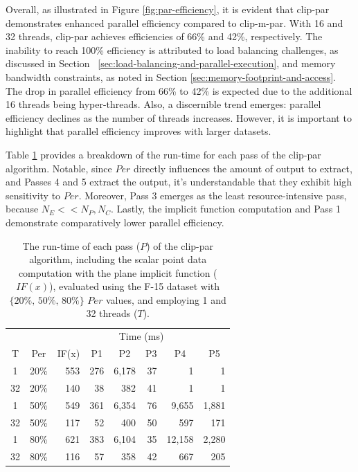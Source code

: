 \documentclass{egpubl}
\begin{document}
Overall, as illustrated in Figure \ref{fig:par-efficiency}, it is evident that clip-par demonstrates enhanced parallel efficiency compared to clip-m-par. With 16 and 32 threads, clip-par achieves efficiencies of 66\% and 42\%, respectively. The inability to reach 100\% efficiency is attributed to load balancing challenges, as discussed in Section ~\ref{sec:load-balancing-and-parallel-execution}, and memory bandwidth constraints, as noted in Section \ref{sec:memory-footprint-and-access}. The drop in parallel efficiency from 66\% to 42\% is expected due to the additional 16 threads being hyper-threads. Also, a discernible trend emerges: parallel efficiency declines as the number of threads increases. However, it is important to highlight that parallel efficiency improves with larger datasets.

Table \ref{tab:pass-time} provides a breakdown of the run-time for each pass of the clip-par algorithm. Notable, since $Per$ directly influences the amount of output to extract, and Passes 4 and 5 extract the output, it's understandable that they exhibit high sensitivity to $Per$. Moreover, Pass 3 emerges as the least resource-intensive pass, because $N_E << N_P, N_C$. Lastly, the implicit function computation and Pass 1 demonstrate comparatively lower parallel efficiency.

\begin{table}[h]
\centering
\caption{The run-time of each pass ($P$) of the clip-par algorithm, including the scalar point data computation with the plane implicit function ($IF(x)$),  evaluated using the F-15 dataset with   $\textit{\{20\%, 50\%, 80\%\}}$ $Per$ values, and employing 1 and 32 threads ($T$).}
\label{tab:pass-time}
\begin{tabular}{cc@{\quad}rrrrrr}
\toprule
\multicolumn{2}{l}{} & \multicolumn{6}{c}{Time (ms)}                                                                                                                                        \\
T  & Per & \multicolumn{1}{c}{IF(x)} & \multicolumn{1}{c}{P1} & \multicolumn{1}{c}{P2} & \multicolumn{1}{c}{P3} & \multicolumn{1}{c}{P4} & \multicolumn{1}{c}{P5} \\
\midrule
1  & 20\% & 553   & 276 & 6,178 & 37 & 1      & 1     \\
32 & 20\% & 140   & 38  & 382   & 41 & 1      & 1     \\
1  & 50\% & 549   & 361 & 6,354 & 76 & 9,655  & 1,881 \\
32 & 50\% & 117   & 52  & 400   & 50 & 597    & 171   \\
1  & 80\% & 621   & 383 & 6,104 & 35 & 12,158 & 2,280 \\
32 & 80\% & 116   & 57  & 358   & 42 & 667    & 205   \\
\bottomrule
\end{tabular}
\end{table}
\end{document}
